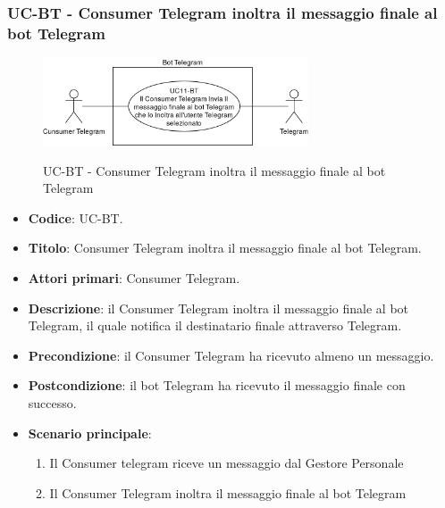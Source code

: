 \subsubsection{UC\theuccount-BT - Consumer Telegram inoltra il messaggio finale al bot Telegram}
	\begin{figure}[H]
		\centering
		\includegraphics[width=0.7\textwidth]{img/casi_d'uso/UC11.png}\\
		\caption{UC\theuccount-BT - Consumer Telegram inoltra il messaggio finale al bot Telegram}
	\end{figure}
	\begin{itemize}
		\item \textbf{Codice}: UC\theuccount-BT.
		\item \textbf{Titolo}: Consumer Telegram inoltra il messaggio finale al bot Telegram.
		\item \textbf{Attori primari}: Consumer Telegram.
		\item \textbf{Descrizione}: il Consumer Telegram inoltra il messaggio finale al bot Telegram, il quale notifica il destinatario finale attraverso Telegram.
		\item \textbf{Precondizione}: il Consumer Telegram ha ricevuto almeno un messaggio.
		\item \textbf{Postcondizione}: il bot Telegram ha ricevuto il messaggio finale con successo.
		\item \textbf{Scenario principale}: 
		\begin{enumerate}
			\item Il Consumer telegram riceve un messaggio dal Gestore Personale
			\item Il Consumer Telegram inoltra il messaggio finale al bot Telegram
		\end{enumerate}
		
	\end{itemize}